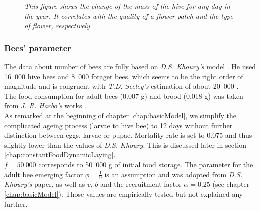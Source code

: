 			\begin{figure}[H]
				\centering
				\caption{\textit{This figure shows the change of the mass of the hive for any day in the year. It correlates with the quality of a flower patch and the type of flower, respectively.}}
				\label{fig:seasonalFlowers}
			\end{figure}
			
		\subsubsection{Bees' parameter}
			\label{chap:beesParameters}
			The data about number of bees are fully based on \textit{D.S. Khoury's} model \cite{khoury13}. He used 16~000 hive bees and 8~000 forager bees, which seems to be the right order of magnitude and is congruent with \textit{T.D. Seeley's} estimation of about 20~000 \cite{seeley95}.\\ 		
			
			The food consumption for adult bees (0.007 g) and brood (0.018 g) was taken from \textit{J. R. Harbo's} works \cite{harbo93}.\\
					
			As remarked at the beginning of chapter \ref{chap:basicModel}, we simplify the complicated ageing process (larvae to hive bee) to 12 days without further distinction between eggs, larvae or pupae. Mortality rate is set to 0.075 and thus slightly lower than the values of \textit{D.S. Khoury}. This is discussed later in section \ref{chap:constantFoodDynamicLaying}.\\

			$f=50~000$ corresponds to 50~000 g of initial food storage. The parameter for the adult bee emerging factor $\phi=\frac{1}{9}$ is an assumption and was adopted from \textit{D.S. Khoury's} paper, as well as $v$, $b$ and the recruitment factor $\alpha = 0.25$ (see chapter \ref{chap:basicModel}). Those values are empirically tested but not explained any further.\\
						
